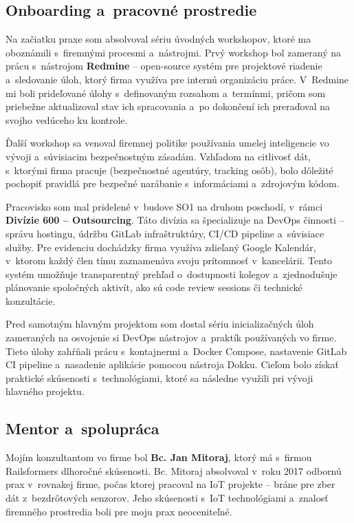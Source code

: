 \subsection{Onboarding a~pracovné prostredie}
\label{sec:Onboarding}

Na začiatku praxe som absolvoval sériu úvodných workshopov, ktoré ma oboznámili s~firemnými procesmi a~nástrojmi. Prvý workshop bol zameraný na prácu s~nástrojom \textbf{Redmine} -- open-source systém pre projektové riadenie a~sledovanie úloh, ktorý firma využíva pre internú organizáciu práce. V~Redmine mi boli prideľované úlohy s~definovaným rozsahom a~termínmi, pričom som priebežne aktualizoval stav ich spracovania a~po dokončení ich preraďoval na svojho vedúceho ku kontrole.

Ďalší workshop sa venoval firemnej politike používania umelej inteligencie vo vývoji a~súvisiacim bezpečnostným zásadám. Vzhľadom na citlivosť dát, s~ktorými firma pracuje (bezpečnostné agentúry, tracking osôb), bolo dôležité pochopiť pravidlá pre bezpečné narábanie s~informáciami a~zdrojovým kódom.

Pracovisko som mal pridelené v~budove SO1 na druhom poschodí, v~rámci \textbf{Divízie 600 -- Outsourcing}. Táto divízia sa špecializuje na DevOps činnosti -- správu hostingu, údržbu GitLab infraštruktúry, CI/CD pipeline a~súvisiace služby. Pre evidenciu dochádzky firma využíva zdieľaný Google Kalendár, v~ktorom každý člen tímu zaznamenáva svoju prítomnosť v~kancelárii. Tento systém umožňuje transparentný prehľad o~dostupnosti kolegov a~zjednodušuje plánovanie spoločných aktivít, ako sú code review sessions či technické konzultácie.

Pred samotným hlavným projektom som dostal sériu inicializačných úloh zameraných na osvojenie si DevOps nástrojov a~praktík používaných vo firme. Tieto úlohy zahŕňali prácu s~kontajnermi a~Docker Compose, nastavenie GitLab CI pipeline a~nasadenie aplikácie pomocou nástroja Dokku. Cieľom bolo získať praktické skúsenosti s~technológiami, ktoré sa následne využili pri vývoji hlavného projektu.

\subsection{Mentor a~spolupráca}
\label{sec:Mentor}

Mojím konzultantom vo firme bol \textbf{Bc. Jan Mitoraj}, ktorý má s~firmou Railsformers dlhoročné skúsenosti. Bc. Mitoraj absolvoval v~roku 2017 odbornú prax v~rovnakej firme, počas ktorej pracoval na IoT projekte -- bráne pre zber dát z~bezdrôtových senzorov. Jeho skúsenosti s~IoT technológiami a~znalosť firemného prostredia boli pre moju prax neoceniteľné.

